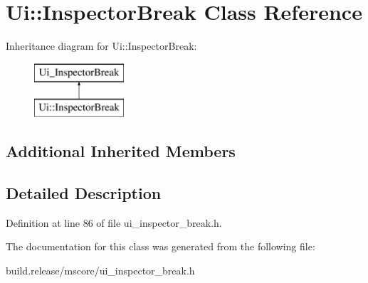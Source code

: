 \hypertarget{class_ui_1_1_inspector_break}{}\section{Ui\+:\+:Inspector\+Break Class Reference}
\label{class_ui_1_1_inspector_break}
Inheritance diagram for Ui\+:\+:Inspector\+Break\+:\begin{figure}[H]
\begin{center}
\leavevmode
\includegraphics[height=2.000000cm]{class_ui_1_1_inspector_break}
\end{center}
\end{figure}
\subsection*{Additional Inherited Members}


\subsection{Detailed Description}


Definition at line 86 of file ui\+\_\+inspector\+\_\+break.\+h.



The documentation for this class was generated from the following file\+:\begin{DoxyCompactItemize}
\item 
build.\+release/mscore/ui\+\_\+inspector\+\_\+break.\+h\end{DoxyCompactItemize}

